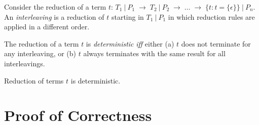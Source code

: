 \documentclass[runningheads,a4paper]{llncs}
\newcommand{\set}[1]{\{#1\}}
\begin{document}
\begin{definition}[Interleaving]
  Consider the reduction of a term $t$: $T_1~|~P_1 \;\longrightarrow\;
  T_2~|~P_2 \;\longrightarrow\; \ldots \;\longrightarrow\;
  \set{t : t = \set{\epsilon}}~|~P_n$. An \emph{interleaving} is a reduction of $t$
  starting in $T_1~|~P_1$ in which reduction rules are
  applied in a different order.
\end{definition}


\begin{definition}[Determinism]
The reduction of a term $t$ is \emph{deterministic} \emph{iff} either
(a) $t$ does not terminate for any interleaving, or (b) $t$ always
terminates with the same result for all interleavings.
\end{definition}

\begin{theorem}
Reduction of terms $t$ is deterministic.
\end{theorem}



\section{Proof of Correctness}
\label{appendix-correctness}

\setcounter{lemma}{0}
\setcounter{theorem}{0}
\setcounter{corollary}{0}
\setcounter{definition}{0}
\end{document}
